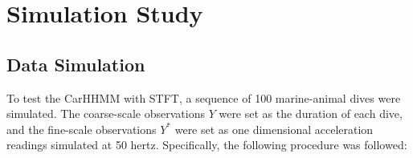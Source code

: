 
\section{Simulation Study}

\subsection{Data Simulation}

To test the CarHHMM with STFT, a sequence of 100 marine-animal dives were simulated. The coarse-scale observations $Y$ were set as the duration of each dive, and the fine-scale observations $Y^*$ were set as one dimensional acceleration readings simulated at 50 hertz. Specifically, the following procedure was followed: 


